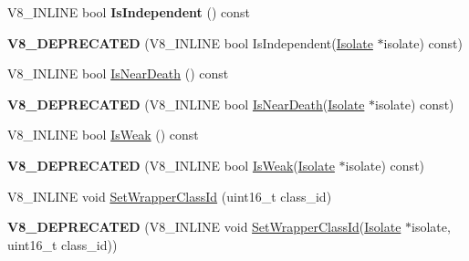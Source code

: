 \begin{DoxyCompactItemize}
\item 
\hypertarget{classv8_1_1_persistent_a4789d71037fe5c69dc282e7f3f4e5ac7}{}V8\+\_\+\+I\+N\+L\+I\+N\+E bool {\bfseries Is\+Independent} () const \label{classv8_1_1_persistent_a4789d71037fe5c69dc282e7f3f4e5ac7}

\item 
\hypertarget{classv8_1_1_persistent_a15bac5dedb5589f06e5829d4a591206a}{}{\bfseries V8\+\_\+\+D\+E\+P\+R\+E\+C\+A\+T\+E\+D} (V8\+\_\+\+I\+N\+L\+I\+N\+E bool Is\+Independent(\hyperlink{classv8_1_1_isolate}{Isolate} $\ast$isolate) const)\label{classv8_1_1_persistent_a15bac5dedb5589f06e5829d4a591206a}

\item 
V8\+\_\+\+I\+N\+L\+I\+N\+E bool \hyperlink{classv8_1_1_persistent_ae4fe9f57506755db8c4e1e1babafce71}{Is\+Near\+Death} () const 
\item 
\hypertarget{classv8_1_1_persistent_afbfc68e4183a6166df5c2fca860cc724}{}{\bfseries V8\+\_\+\+D\+E\+P\+R\+E\+C\+A\+T\+E\+D} (V8\+\_\+\+I\+N\+L\+I\+N\+E bool \hyperlink{classv8_1_1_persistent_ae4fe9f57506755db8c4e1e1babafce71}{Is\+Near\+Death}(\hyperlink{classv8_1_1_isolate}{Isolate} $\ast$isolate) const)\label{classv8_1_1_persistent_afbfc68e4183a6166df5c2fca860cc724}

\item 
V8\+\_\+\+I\+N\+L\+I\+N\+E bool \hyperlink{classv8_1_1_persistent_a088127d75c3c6405f76e8208c9b22204}{Is\+Weak} () const 
\item 
\hypertarget{classv8_1_1_persistent_a5d56abba0b838ec0c0ec2df2d1fbe306}{}{\bfseries V8\+\_\+\+D\+E\+P\+R\+E\+C\+A\+T\+E\+D} (V8\+\_\+\+I\+N\+L\+I\+N\+E bool \hyperlink{classv8_1_1_persistent_a088127d75c3c6405f76e8208c9b22204}{Is\+Weak}(\hyperlink{classv8_1_1_isolate}{Isolate} $\ast$isolate) const)\label{classv8_1_1_persistent_a5d56abba0b838ec0c0ec2df2d1fbe306}

\item 
V8\+\_\+\+I\+N\+L\+I\+N\+E void \hyperlink{classv8_1_1_persistent_ae13a65ef19dd410fd8eb1ef970139149}{Set\+Wrapper\+Class\+Id} (uint16\+\_\+t class\+\_\+id)
\item 
\hypertarget{classv8_1_1_persistent_a6709fcacf8c4262afba4645b6adba146}{}{\bfseries V8\+\_\+\+D\+E\+P\+R\+E\+C\+A\+T\+E\+D} (V8\+\_\+\+I\+N\+L\+I\+N\+E void \hyperlink{classv8_1_1_persistent_ae13a65ef19dd410fd8eb1ef970139149}{Set\+Wrapper\+Class\+Id}(\hyperlink{classv8_1_1_isolate}{Isolate} $\ast$isolate, uint16\+\_\+t class\+\_\+id))\label{classv8_1_1_persistent_a6709fcacf8c4262afba4645b6adba146}


\end{DoxyCompactItemize}
